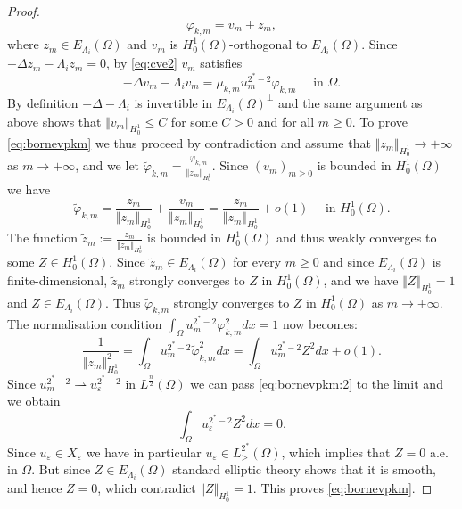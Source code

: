 \documentclass[10pt]{amsart}
\numberwithin{equation}{section}
\newcommand{\ve}{\varepsilon}
\newcommand{\vp}{\varphi}
\newcommand{\Om}{\Omega}
\theoremstyle{plain}
\theoremstyle{remark}
\begin{document}
\begin{proof}
$$ \vp_{k,m} = v_m + z_m, $$
where $z_m \in E_{\Lambda_i}(\Om)$ and $v_m$ is $H^1_0(\Om)$-orthogonal to $E_{\Lambda_i}(\Om)$. Since $-\Delta z_m - \Lambda_i z_m = 0$, by \eqref{eq:cve2} $v_m$ satisfies 
\begin{equation*} 
 - \Delta v_m - \Lambda_i v_m = \mu_{k,m} u_m^{2^*-2} \vp_{k,m} \quad \text{ in } \Om. 
 \end{equation*}
By definition $- \Delta-\Lambda_i$ is invertible in $E_{\Lambda_i}(\Om)^{\perp}$ and the same argument as above shows that $\Vert v_m \Vert_{H^1_0} \le C $ for some $C>0$ and for all $m \ge 0$. To prove \eqref{eq:bornevpkm} we thus proceed by contradiction and assume that $\Vert z_m \Vert_{H^1_0} \to + \infty$ as $m \to + \infty$, and we let $\tilde{\vp}_{k,m} = \frac{\vp_{k,m}}{\Vert z_m\Vert_{H^1_0}}$. Since $(v_m)_{m \ge0}$ is bounded in $H^1_0(\Om)$ we have 
$$ \tilde{\vp}_{k,m} = \frac{z_m}{\Vert z_m\Vert_{H^1_0}} + \frac{v_m}{\Vert z_m\Vert_{H^1_0}} = \frac{z_m}{\Vert z_m\Vert_{H^1_0}}  + o(1) \quad \text{ in } H^1_0(\Om). $$
The function  $ \tilde{z}_m:=\frac{z_m}{\Vert z_m\Vert_{H^1_0}}$ is bounded in $H^1_0(\Om)$ and thus weakly converges to some $Z \in H^1_0(\Om)$. Since $\tilde{z}_m \in E_{\Lambda_i}(\Om)$ for every $m \ge 0$ and since $E_{\Lambda_i}(\Om)$ is finite-dimensional, $\tilde{z}_m$ strongly converges to $Z$ in $H^1_0(\Om)$, and we have $\Vert Z \Vert_{H^1_0} =1$ and $Z \in E_{\Lambda_i}(\Om)$. Thus $\tilde{\vp}_{k,m}$ strongly converges to $Z$ in $H^1_0(\Om)$ as $m \to + \infty$. The normalisation condition $\int_{\Om} u_m^{2^*-2} \vp_{k,m}^2dx = 1$ now becomes:
\begin{equation} \label{eq:bornevpkm:2}
 \frac{1}{\Vert z_m \Vert_{H^1_0}^2} =  \int_{\Om} u_m^{2^*-2} \tilde{\vp}_{k,m}^2dx = \int_{\Om} u_m^{2^*-2} Z^2dx + o(1). 
 \end{equation}
Since $u_m^{2^*-2} \rightharpoonup u_{\ve}^{2^*-2}$ in $L^{\frac{n}{2}}(\Om)$ we can pass \eqref{eq:bornevpkm:2} to the limit  and we obtain 
$$ \int_{\Om} u_\ve^{2^*-2} Z^2dx = 0. $$
Since $u_\ve \in X_\ve$ we have in particular $u_\ve \in L^{2^*}_{>}(\Om)$, which implies that $Z = 0$ a.e. in $\Om$. But since $Z \in E_{\Lambda_i}(\Om)$ standard elliptic theory shows that it is smooth, and hence $Z = 0$, which contradict $\Vert Z \Vert_{H^1_0} = 1$. This proves \eqref{eq:bornevpkm}. 



\end{proof}
\end{document}
